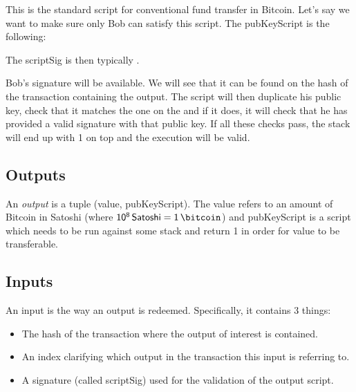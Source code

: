 
This is the standard script for conventional fund transfer in Bitcoin. Let's say we want to make sure only Bob can satisfy this script. The \textsf{pubKeyScript} is the following:
\begin{center}
\end{center}
\noindent The \textsf{scriptSig} is then typically .

Bob's signature will be available. We will see that it can be found on the hash of the transaction containing the output. The script will then duplicate his public key, check that it matches the one on the  and if it does, it will check that he has provided a valid signature with that public key. If all these checks pass, the stack will end up with 1 on top and the execution will be valid.

\subsection{\label{sec:outputs}Outputs}
An \emph{output} is a tuple ({\sf value, pubKeyScript}). The \textsf{value} refers to an amount of Bitcoin in Satoshi (where $\sf 10^8 \, Satoshi = 1 \, \bitcoin$) and \textsf{pubKeyScript} is a script which needs to be run against some stack and return 1 in order for \textsf{value} to be transferable.

\subsection{\label{sec:inputs}Inputs}
An input is the way an output is redeemed. Specifically, it contains 3 things:
\begin{itemize}
  \item The hash of the transaction where the output of interest is contained.
  \item An index clarifying which output in the transaction this input is referring to.
  \item A signature (called \textsf{scriptSig}) used for the validation of the output script.
\end{itemize}

